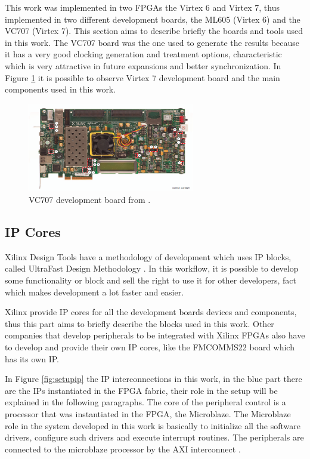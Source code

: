 This work was implemented in two FPGAs the Virtex 6 and Virtex 7, thus
implemented in two different development boards, the ML605 (Virtex 6) and the
VC707 (Virtex 7). This section aims to describe briefly the boards and tools
used in this work. The VC707 board was the one used to generate the results
because it has a very good clocking generation and treatment options,
characteristic which is very attractive in future expansions and better
synchronization. In Figure \ref{fig:vc707} it is possible to observe Virtex 7
development board and the main components used in this work.

\begin{figure}[htbp]
    \centering
    \includegraphics[width=0.65\textwidth]{./figures/vc707}
    \caption{ VC707 development board from \cite{xilinx:vc707}.
    \label{fig:vc707}}
\end{figure}

\subsection{IP Cores}

Xilinx Design Tools have a methodology of development which uses IP blocks,
called UltraFast Design Methodology \cite{xilinx:ultrafast}. In this workflow,
it is possible to develop some functionality or block and sell the right to use
it for other developers, fact which makes development a lot faster and easier.

Xilinx provide IP cores for all the development boards devices and components,
thus this part aims to briefly describe the blocks used in this work. Other
companies that develop peripherals to be integrated with Xilinx FPGAs also have
to develop and provide their own IP cores, like the FMCOMMS22 board which has its
own IP.

In Figure \ref{fig:setupip} the IP interconnections in this work, in the blue
part there are the IPs instantiated in the FPGA fabric, their role in the setup
will be explained in the following paragraphs. The core of the peripheral
control is a processor that was instantiated in the FPGA, the Microblaze. The
Microblaze role in the system developed in this work is basically to initialize
all the software drivers, configure such drivers and execute interrupt
routines. The peripherals are connected to the microblaze processor by the AXI
interconnect \cite{xilinx:axiconn}.

